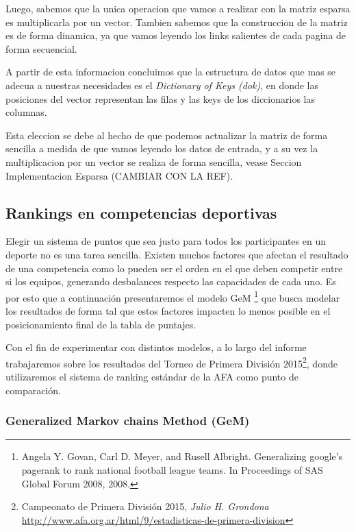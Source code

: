 Luego, sabemos que la unica operacion que vamos a realizar con la matriz esparsa es multiplicarla por un vector. Tambien sabemos que la
construccion de la matriz es de forma dinamica, ya que vamos leyendo los links salientes de cada pagina de forma secuencial.

A partir de esta informacion concluimos que la estructura de datos que mas se adecua a nuestras necesidades es el \textit{Dictionary
of Keys (dok)}, en donde las posiciones del vector representan las filas y las keys de los diccionarios las columnas.

Esta eleccion se debe al hecho de que podemos actualizar la matriz de forma sencilla a medida de que vamos leyendo los datos de entrada, y a su vez
 la multiplicacion por un vector se realiza de forma sencilla, vease Seccion Implementacion Esparsa (CAMBIAR CON LA REF).





\subsection{Rankings en competencias deportivas}

Elegir un sistema de puntos que sea justo para todos los participantes en un
deporte no es una tarea sencilla. Existen muchos factores que afectan el
resultado de una competencia como lo pueden ser el orden en el que deben
competir entre si los equipos, generando desbalances respecto las capacidades de
cada uno. Es por esto que a continuación presentaremos el modelo GeM
\footnote{Angela Y. Govan, Carl D. Meyer, and Rusell Albright. Generalizing
google’s pagerank to rank national football league teams. In Proceedings of SAS
Global Forum 2008, 2008.} que busca modelar los resultados de forma tal que estos
factores impacten lo menos posible en el posicionamiento final de la tabla de
puntajes.

Con el fin de experimentar con distintos modelos, a lo largo del informe
trabajaremos sobre los resultados del Torneo de Primera División
2015\footnote{Campeonato de Primera División 2015, \textit{Julio H. Grondona} \\
\url{http://www.afa.org.ar/html/9/estadisticas-de-primera-division}}, donde
utilizaremos el sistema de ranking estándar de la AFA como punto de comparación.

\subsubsection{Generalized Markov chains Method (GeM)}
\label{sec:gem_model}

